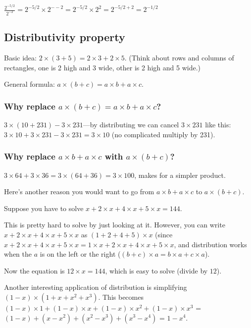\documentclass[fullpage,twocolumn]{article}
\begin{document}
$\frac{2^{-5/2}}{2^{-2}} = 2^{-5/2} \times {2^{- -2}} = 2^{-5/2} \times {2^{2}} = 2^{-5/2 + 2} = 2^{-1/2}$


\subsection{Distributivity property}

Basic idea: $2 \times ( 3 + 5 ) = 2 \times 3 + 2 \times 5$. (Think about rows and columns of rectangles, one is 2 high and 3 wide, other is 2 high and 5 wide.)

General formula: $a \times ( b + c) = a \times b + a \times c$.

\subsubsection*{Why replace $a \times ( b + c) = a \times b + a \times c$?}

$3 \times ( 10 + 231 ) - 3 \times 231$---by distributing we can cancel $3 \times 231$ like this:
$3 \times 10 + 3 \times 231 - 3 \times 231 = 3 \times 10$ (no complicated multiply by 231).

\subsubsection*{Why replace $a \times b + a \times c$ with $a \times ( b + c)$?}

$3 \times 64 + 3 \times 36 = 3 \times (64 + 36) = 3 \times 100$, makes for a simpler product.

Here's another reason you would want to go from $a \times b + a \times c$ to $a \times ( b + c)$.

Suppose you have to solve $x + 2 \times x + 4 \times x + 5 \times x = 144$.

This is pretty hard to solve by just looking at it. However, you can write $x + 2 \times x + 4 \times x + 5 \times x$
as $(1 + 2 + 4 + 5)\times x$ (since $x + 2 \times x + 4 \times x + 5 \times x = 1 \times x + 2 \times x + 4 \times x + 5 \times x$,
and distribution works when the $a$ is on the left or the right ($(b+c)\times a = b \times a + c \times a$).

Now the equation is $12 \times x = 144$, which is easy to solve (divide by $12$).

Another interesting application of distribution is simplifying $(1-x)\times(1 + x + x^2 + x^3)$. This becomes
$(1-x)\times 1 + (1-x)\times x + (1-x)\times x^2 + (1-x)\times x^3$ = $(1 - x) + (x - x^2)  + (x^2 - x^3) + (x^3 - x^4)$ = $1 - x^4$.
\end{document}
